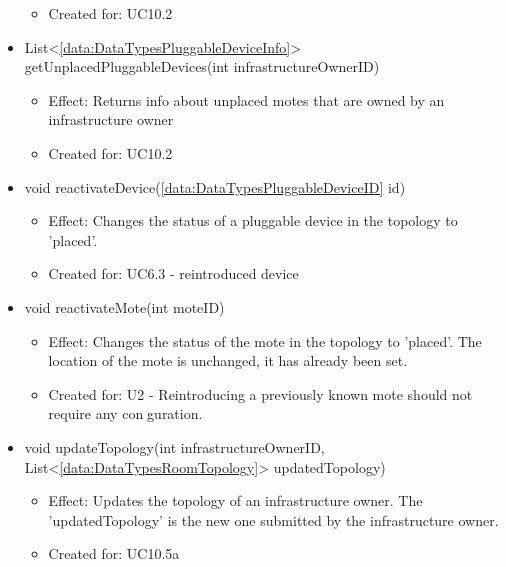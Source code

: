 \begin{description}
\begin{itemize}[noitemsep,nolistsep,leftmargin=-.25cm]
\begin{itemize}[noitemsep,nolistsep]
\item Created for: UC10.2
        \end{itemize}
      \item \textsf{List\textless{}\ref{data:DataTypesPluggableDeviceInfo}\textgreater{} getUnplacedPluggableDevices(int infrastructureOwnerID)}
        \begin{itemize}[noitemsep,nolistsep]
           \item Effect: Returns info about unplaced motes that are owned by an infrastructure owner
\item Created for: UC10.2
        \end{itemize}
      \item \textsf{void reactivateDevice(\ref{data:DataTypesPluggableDeviceID} id)}
        \begin{itemize}[noitemsep,nolistsep]
           \item Effect: Changes the status of a pluggable device in the topology to 'placed'.
\item Created for: UC6.3 - reintroduced device
        \end{itemize}
      \item \textsf{void reactivateMote(int moteID)}
        \begin{itemize}[noitemsep,nolistsep]
           \item Effect: Changes the status of the mote in the topology to 'placed'. The location of the mote is unchanged, it has already been set.
\item Created for: U2 - Reintroducing a previously known mote should not require any conguration.
        \end{itemize}
      \item \textsf{void updateTopology(int infrastructureOwnerID, List\textless{}\ref{data:DataTypesRoomTopology}\textgreater{} updatedTopology)}
        \begin{itemize}[noitemsep,nolistsep]
           \item Effect: Updates the topology of an infrastructure owner. The 'updatedTopology' is the new one submitted by the infrastructure owner.
\item Created for: UC10.5a
        \end{itemize}
    \end{itemize}
    \end{description}

